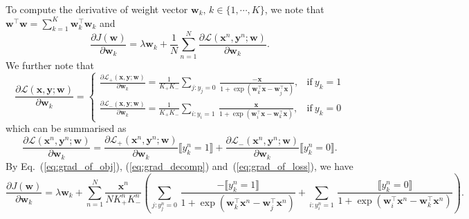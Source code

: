 \documentclass[9pt]{extarticle}
\newcommand{\llb}{\llbracket}
\newcommand{\rrb}{\rrbracket}
\newcommand{\x}{\mathbf{x}}
\newcommand{\y}{\mathbf{y}}
\newcommand{\1}{\mathbf{1}}
\newcommand{\w}{\mathbf{w}}
\newcommand{\LCal}{\mathcal{L}}
\newcommand{\pb}[1]{^{({#1})}}
\begin{document}

To compute the derivative of weight vector $\w_k, \, k \in \{1,\cdots,K\}$, we note that $\w^\top \w = \sum_{k=1}^K \w_k^\top \w_k$ and 
\begin{equation}
\label{eq:grad_of_obj}
\frac{\partial J(\w)} {\partial \w_k} = \lambda \w_k + \frac{1}{N} \sum_{n=1}^N \frac{\partial \LCal(\x^n, \y^n; \w)} {\partial \w_k}.
\end{equation}
We further note that 
\begin{equation}
\label{eq:grad_decomp}
\frac{\partial \LCal(\x, \y; \w)} {\partial \w_k} =
\begin{cases}
\frac{\partial \LCal_+(\x, \y; \w)} {\partial \w_k} = \frac{1}{K_+ K_-} \underset{j:y_j=0}{\sum} \, \frac{-\x} {1 + \exp(\w_k^\top \x - \w_j^\top \x)}, 
    & \text{if} \ y_k=1 \\
\frac{\partial \LCal_-(\x, \y; \w)} {\partial \w_k} = \frac{1}{K_+ K_-} \underset{i:y_i=1}{\sum} \, \frac{\x} {1 + \exp(\w_i^\top \x - \w_k^\top \x)},
    & \text{if} \ y_k=0
\end{cases}
\end{equation}
which can be summarised as
\begin{equation}
\label{eq:grad_of_loss}
\frac{\partial \LCal(\x^n, \y^n; \w)} {\partial \w_k} =
\frac{\partial \LCal_+(\x^n, \y^n; \w)} {\partial \w_k} \llb y_k^n=1 \rrb +
\frac{\partial \LCal_-(\x^n, \y^n; \w)} {\partial \w_k} \llb y_k^n=0 \rrb.
\end{equation}
%
By Eq.~(\ref{eq:grad_of_obj}), (\ref{eq:grad_decomp}) and~(\ref{eq:grad_of_loss}), we have
\begin{equation}
\label{eq:grad_k}
\frac{\partial J(\w)} {\partial \w_k} = \lambda \w_k + \sum_{n=1}^N \frac{\x^n}{N K_+^n K_-^n} \left(
\underset{j:y_j^n=0}{\sum} \, \frac{-\llb y_k^n=1 \rrb} {1 + \exp(\w_k^\top \x^n - \w_j^\top \x^n)} +
\underset{i:y_i^n=1}{\sum} \, \frac{ \llb y_k^n=0 \rrb} {1 + \exp(\w_i^\top \x^n - \w_k^\top \x^n)} \right).
\end{equation}
\end{document}
